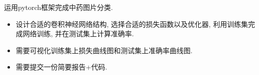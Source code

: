 运用pytorch框架完成中药图片分类.

\begin{itemize}
    \item 设计合适的卷积神经网络结构, 选择合适的损失函数以及优化器, 利用训练集完成网络训练, 并在测试集上计算准确率.
    \item 需要可视化训练集上损失曲线图和测试集上准确率曲线图.
    \item 需要提交一份简要报告+代码.
\end{itemize}
